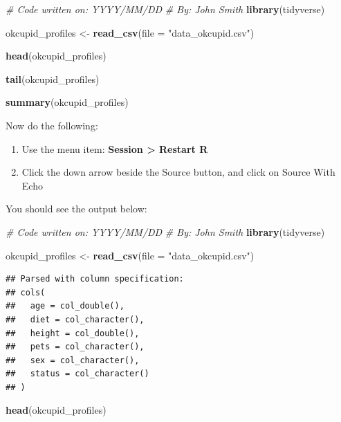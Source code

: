 \documentclass[
]{krantz}
\makeatletter
\newenvironment{Shaded}{\begin{snugshade}}{\end{snugshade}}
\newcommand{\CommentTok}[1]{\textcolor[rgb]{0.37,0.37,0.37}{\textit{#1}}}
\newcommand{\DataTypeTok}[1]{\textcolor[rgb]{0.27,0.27,0.27}{#1}}
\newcommand{\KeywordTok}[1]{\textcolor[rgb]{0.27,0.27,0.27}{\textbf{#1}}}
\newcommand{\NormalTok}[1]{#1}
\newcommand{\StringTok}[1]{\textcolor[rgb]{0.5,0.5,0.5}{#1}}
\providecommand{\tightlist}{%
  \setlength{\itemsep}{0pt}\setlength{\parskip}{0pt}}
\newenvironment{kframe}{%
\medskip{}
\setlength{\fboxsep}{.8em}
 \def\at@end@of@kframe{}%
 \ifinner\ifhmode%
  \def\at@end@of@kframe{\end{minipage}}%
  \begin{minipage}{\columnwidth}%
 \fi\fi%
 \def\FrameCommand##1{\hskip\@totalleftmargin \hskip-\fboxsep
 \colorbox{shadecolor}{##1}\hskip-\fboxsep
     \hskip-\linewidth \hskip-\@totalleftmargin \hskip\columnwidth}%
 \MakeFramed {\advance\hsize-\width
   \@totalleftmargin\z@ \linewidth\hsize
   \@setminipage}}%
 {\par\unskip\endMakeFramed%
 \at@end@of@kframe}
\renewenvironment{Shaded}{\begin{kframe}}{\end{kframe}}
\makeatother
\begin{document}
\begin{Shaded}
\begin{Highlighting}[]
\CommentTok{# Code written on: YYYY/MM/DD }
\CommentTok{# By: John Smith}
\KeywordTok{library}\NormalTok{(tidyverse)}

\NormalTok{okcupid_profiles <-}\StringTok{ }\KeywordTok{read_csv}\NormalTok{(}\DataTypeTok{file =} \StringTok{"data_okcupid.csv"}\NormalTok{)}

\KeywordTok{head}\NormalTok{(okcupid_profiles)}

\KeywordTok{tail}\NormalTok{(okcupid_profiles)}

\KeywordTok{summary}\NormalTok{(okcupid_profiles)}
\end{Highlighting}
\end{Shaded}

Now do the following:

\begin{enumerate}
\def\labelenumi{\arabic{enumi}.}
\tightlist
\item
  Use the menu item: \textbf{Session \textgreater{} Restart R}
\item
  Click the down arrow beside the Source button, and click on Source With Echo
\end{enumerate}

You should see the output below:

\begin{Shaded}
\begin{Highlighting}[]
\CommentTok{# Code written on: YYYY/MM/DD }
\CommentTok{# By: John Smith}
\KeywordTok{library}\NormalTok{(tidyverse)}

\NormalTok{okcupid_profiles <-}\StringTok{ }\KeywordTok{read_csv}\NormalTok{(}\DataTypeTok{file =} \StringTok{"data_okcupid.csv"}\NormalTok{)}
\end{Highlighting}
\end{Shaded}

\begin{verbatim}
## Parsed with column specification:
## cols(
##   age = col_double(),
##   diet = col_character(),
##   height = col_double(),
##   pets = col_character(),
##   sex = col_character(),
##   status = col_character()
## )
\end{verbatim}

\begin{Shaded}
\begin{Highlighting}[]
\KeywordTok{head}\NormalTok{(okcupid_profiles)}
\end{Highlighting}
\end{Shaded}
\end{document}
